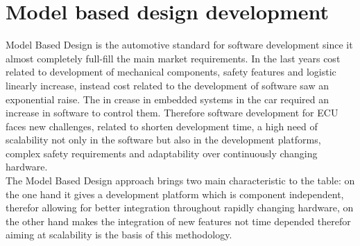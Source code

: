 \documentclass[../main.tex]{subfiles}
\begin{document}
\section{Model based design development}
Model Based Design is the automotive standard for software development since it almost completely full-fill the main market requirements. In the last years cost related to development of mechanical components, safety features and logistic linearly increase, instead cost related to the development of software saw an exponential raise. The in crease in embedded systems in the car required an increase in software to control them. Therefore software development for \gls{ECU} faces new challenges, related to shorten development time, a high need of scalability  not only in the software but also in the development platforms, complex safety requirements and adaptability over continuously changing hardware.\\
The Model Based Design approach brings two main characteristic to the table: on the one hand it gives a development platform which is component independent, therefor allowing for better integration throughout rapidly changing hardware, on the other hand makes the integration of new features not time depended therefor aiming at scalability is the basis of this methodology. 
\end{document}
